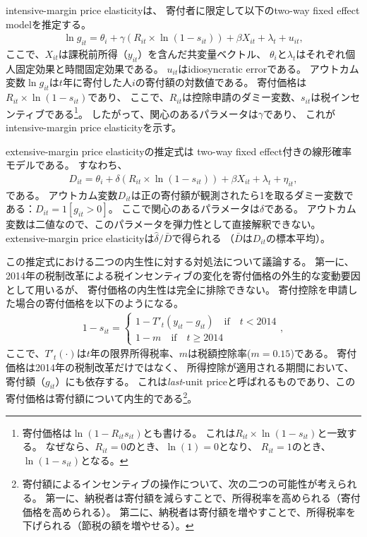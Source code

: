 \documentclass[
  11pt,
  a4paper,
]{article}
\begin{document}
intensive-margin price elasticityは、
寄付者に限定して以下のtwo-way fixed effect modelを推定する。
\begin{align}
  \ln g_{it} = \theta_i + \gamma (R_{it} \times \ln (1 - s_{it}))
    + \beta X_{it} + \lambda_t + u_{it}, \label{eq:intensive}
\end{align}
ここで、\(X_{it}\)は課税前所得（\(y_{it}\)）を含んだ共変量ベクトル、
\(\theta_i\)と\(\lambda_t\)はそれぞれ個人固定効果と時間固定効果である。
\(u_{it}\)はidiosyncratic errorである。
アウトカム変数\(\ln g_{it}\)は\(t\)年に寄付した人\(i\)の寄付額の対数値である。
寄付価格は\(R_{it} \times \ln (1 - s_{it})\)であり、
ここで、\(R_{it}\)は控除申請のダミー変数、\(s_{it}\)は税インセンティブである\footnote{寄付価格は\(\ln(1 - R_{it}s_{it})\)とも書ける。
  これは\(R_{it} \times \ln (1 - s_{it})\)と一致する。
  なぜなら、\(R_{it} = 0\)のとき、\(\ln(1) = 0\)となり、
  \(R_{it} = 1\)のとき、\(\ln(1 - s_{it})\)となる。}。
したがって、関心のあるパラメータは\(\gamma\)であり、
これがintensive-margin price elasticityを示す。

extensive-margin price elasticityの推定式は
two-way fixed effect付きの線形確率モデルである。
すなわち、
\begin{align}
  D_{it} = \theta_i + \delta (R_{it} \times \ln (1 - s_{it}))
    + \beta X_{it} + \lambda_t + \eta_{it}, \label{eq:extensive}
\end{align}
である。
アウトカム変数\(D_{it}\)は正の寄付額が観測されたら1を取るダミー変数である：\(D_{it} = 1[g_{it} > 0]\)。
ここで関心のあるパラメータは\(\delta\)である。
アウトカム変数は二値なので、このパラメータを弾力性として直接解釈できない。
extensive-margin price elasticityは\(\hat{\delta} / \bar{D}\)で得られる
（\(\bar{D}\)は\(D_{it}\)の標本平均）。

この推定式における二つの内生性に対する対処法について議論する。
第一に、
2014年の税制改革による税インセンティブの変化を寄付価格の外生的な変動要因として用いるが、
寄付価格の内生性は完全に排除できない。
寄付控除を申請した場合の寄付価格を以下のようになる。
\begin{align}
  1 - s_{it} =
  \begin{cases}
    1 - T'_t(y_{it} - g_{it})  \quad\text{if}\quad t < 2014  \\
    1 - m \quad\text{if}\quad t \ge 2014
  \end{cases},
\end{align}
ここで、\(T'_t(\cdot)\)は\(t\)年の限界所得税率、\(m\)は税額控除率(\(m = 0.15\))である。
寄付価格は2014年の税制改革だけではなく、
所得控除が適用される期間において、寄付額（\(g_{it}\)）にも依存する。
これは\emph{last}-unit priceと呼ばれるものであり、この寄付価格は寄付額について内生的である\footnote{寄付額によるインセンティブの操作について、次の二つの可能性が考えられる。
  第一に、納税者は寄付額を減らすことで、所得税率を高められる（寄付価格を高められる）。
  第二に、納税者は寄付額を増やすことで、所得税率を下げられる（節税の額を増やせる）。}。
\end{document}

